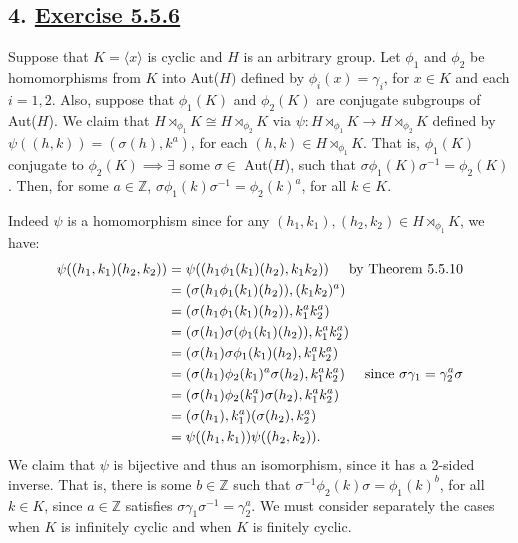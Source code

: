 \subsection*{4. \underline{Exercise 5.5.6}}
Suppose that $K = \langle x \rangle$ is cyclic and $H$ is an arbitrary group. Let $\phi_1$ and $\phi_2$ be homomorphisms from $K$ into Aut($H)$ defined by $\phi_i(x) = \gamma_i$, for $x \in K$ and each $i = 1,2$.  Also, suppose that $\phi_1(K)$ and $\phi_2(K)$ are conjugate subgroups of Aut($H$). We claim that $H \rtimes_{\phi_1} K \cong H \rtimes_{\phi_2} K$ via $\psi: H \rtimes_{\phi_1} K \rightarrow H \rtimes_{\phi_2} K$ defined by $\psi((h,k)) = (\sigma(h), k^a)$, for each $(h,k) \in H \rtimes_{\phi_1} K$. That is, $\phi_1(K)$ conjugate to $\phi_2(K) \implies \exists$ some $\sigma \in$ Aut($H$), such that $\sigma\phi_1(K)\sigma^{-1} = \phi_2(K)$. Then, for some $a \in \mathbb{Z}$, $\sigma\phi_1(k)\sigma^{-1} = \phi_2(k)^a$, for all $k \in K$.

Indeed $\psi$ is a homomorphism since for any $(h_1,k_1),(h_2,k_2) \in H \rtimes_{\phi_1} K$, we have:
\begin{align*}
    \psi((h_1,k_1)(h_2,k_2)) &= \psi((h_1\phi_1(k_1)(h_2), k_1k_2)) \hspace{5mm} \textnormal{by Theorem 5.5.10} \\
    &= (\sigma(h_1\phi_1(k_1)(h_2)), (k_1k_2)^a) \\
    &= (\sigma(h_1\phi_1(k_1)(h_2)), k_1^a k_2^a) \\
    &= (\sigma(h_1)\sigma(\phi_1(k_1)(h_2)), k_1^a k_2^a) \\
    &= (\sigma(h_1)\sigma\phi_1(k_1)(h_2), k_1^a k_2^a) \\
    &= (\sigma(h_1)\phi_2(k_1)^a\sigma(h_2), k_1^a k_2^a) \hspace{5mm} \textnormal{since } \sigma\gamma_1 = \gamma_2^a\sigma \\
    &= (\sigma(h_1)\phi_2(k_1^a)\sigma(h_2), k_1^a k_2^a) \\
    &= (\sigma(h_1),k_1^a)(\sigma(h_2),k_2^a) \\
    &= \psi((h_1,k_1))\psi((h_2,k_2)).
\end{align*}
We claim that $\psi$ is bijective and thus an isomorphism, since it has a 2-sided inverse. That is, there is some $b \in \mathbb{Z}$ such that $\sigma^{-1}\phi_2(k)\sigma = \phi_1(k)^b$, for all $k \in K$, since $a \in \mathbb{Z}$ satisfies $\sigma\gamma_1\sigma^{-1} = \gamma_2^a$. We must consider separately the cases when $K$ is infinitely cyclic and when $K$ is finitely cyclic.

